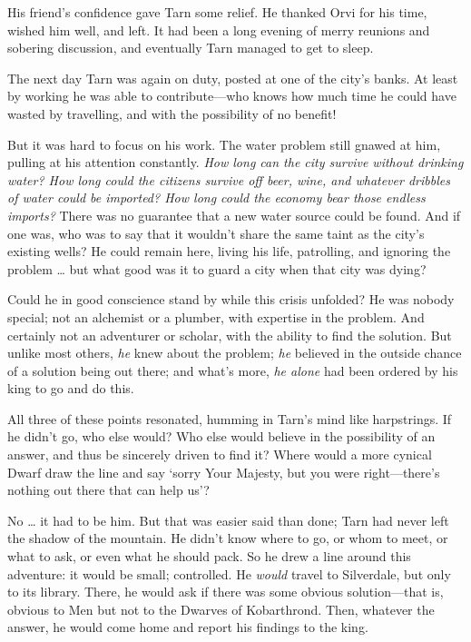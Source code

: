 His friend's confidence gave Tarn some relief.  He thanked Orvi for his time, wished him well, and left.  It had been a long evening of merry reunions and sobering discussion, and eventually Tarn managed to get to sleep.

The next day Tarn was again on duty, posted at one of the city's banks.  At least by working he was able to contribute---who knows how much time he could have wasted by travelling, and with the possibility of no benefit!

But it was hard to focus on his work.  The water problem still gnawed at him, pulling at his attention constantly.  \emph{How long can the city survive without drinking water?  How long could the citizens survive off beer, wine, and whatever dribbles of water could be imported?  How long could the economy bear those endless imports?}  There was no guarantee that a new water source could be found.  And if one was, who was to say that it wouldn't share the same taint as the city's existing wells?  He could remain here, living his life, patrolling, and ignoring the problem \ldots{} but what good was it to guard a city when that city was dying?

Could he in good conscience stand by while this crisis unfolded?  He was nobody special; not an alchemist or a plumber, with expertise in the problem.  And certainly not an adventurer or scholar, with the ability to find the solution. But unlike most others, \emph{he} knew about the problem; \emph{he} believed in the outside chance of a solution being out there; and what's more, \emph{he alone} had been ordered by his king to go and do this.

All three of these points resonated, humming in Tarn's mind like harpstrings.  If he didn't go, who else would?  Who else would believe in the possibility of an answer, and thus be sincerely driven to find it?  Where would a more cynical Dwarf draw the line and say `sorry Your Majesty, but you were right---there's nothing out there that can help us'?

No \ldots{} it had to be him.  But that was easier said than done; Tarn had never left the shadow of the mountain.  He didn't know where to go, or whom to meet, or what to ask, or even what he should pack.  So he drew a line around this adventure: it would be small; controlled.  He \emph{would} travel to Silverdale, but only to its library.  There, he would ask if there was some obvious solution---that is, obvious to Men but not to the Dwarves of Kobarthrond.  Then, whatever the answer, he would come home and report his findings to the king.

